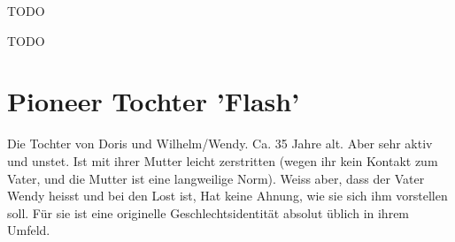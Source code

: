 \begin{npcBox}[title=Doris]
    \begin{consequences}
    \item {}
    \item {}
    \item {}
    \end{consequences}

    \begin{npcDescription}
    TODO
    \end{npcDescription}


    \begin{equipment}
    \item TODO
    \end{equipment}
\end{npcBox}
\newpage

\section{Pioneer Tochter 'Flash'}
Die Tochter von Doris und Wilhelm/Wendy. Ca. 35 Jahre alt. Aber sehr aktiv und unstet. Ist mit ihrer Mutter leicht zerstritten (wegen ihr kein Kontakt zum Vater, und die Mutter ist eine langweilige Norm). Weiss aber, dass der Vater Wendy heisst und bei den Lost ist, Hat keine Ahnung, wie sie sich ihm vorstellen soll. Für sie ist eine originelle Geschlechtsidentität absolut üblich in ihrem Umfeld.


